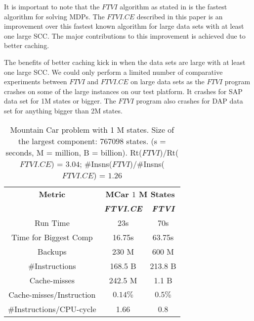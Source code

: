 \documentclass[conference]{IEEEtran}
\begin{document}
It is important to note that the $FTVI$ algorithm as stated in \cite{b10} is the fastest algorithm for solving MDPs. The $FTVI.CE$ described in this paper is an improvement over this fastest known algorithm for large data sets with at least one large SCC. The major contributions to this improvement is achieved due to better caching.

The benefits of better caching kick in when the data sets are large with at least one large SCC. We could only perform a limited number of comparative experiments between $FTVI$ and $FTVI.CE$ on large data sets as the $FTVI$ program crashes on some of the large instances on our test platform. It crashes for SAP data set for 1M states or bigger. The $FTVI$ program also crashes for DAP data set for anything bigger than 2M states.

\label{sec:tables}
\begin{table}[h!]
\caption{Mountain Car problem with 1 M states. Size of the largest component: $767098$ states. (s = seconds, M = million, B = billion). Rt($FTVI$)/Rt($FTVI.CE$) = $3.04$;  \#Insns($FTVI$)/\#Insns($FTVI.CE$) = $1.26$}
\vskip 0.18in
\begin{center}
\begin{small}
\begin{sc}
\begin{tabular}{|c|c|c|}
\hline
\textbf{Metric}&\multicolumn{2}{|c|}{\textbf{MCar $1$ M States}} \\
\cline{2-3}
\textbf{} & \textbf{\textit{FTVI.CE}}& \textbf{\textit{FTVI}} \\
\hline
Run Time & 23s & 70s \\
\hline
Time for Biggest Comp & 16.75s & 63.75s \\
\hline
Backups & 230 M & 600 M \\
\hline
\#Instructions & 168.5 B & 213.8 B \\
\hline
Cache-misses & 242.5 M & 1.1 B \\
\hline 
Cache-misses/Instruction & $0.14\%$ & $0.5\%$ \\
\hline
\#Instructions/CPU-cycle & 1.66 & 0.8 \\
\hline
\end{tabular}
\end{sc}
\end{small}
\label{tab1}
\end{center}
\vskip -0.1in
\end{table}
\end{document}
